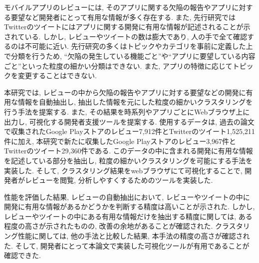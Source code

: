 
モバイルアプリのレビューには, そのアプリに関する欠陥の報告やアプリに対する要望など開発者にとって有用な情報が多く存在する. また, 先行研究ではTwitterのツイートにはアプリに関する開発に有用な情報が記述されることが示されている. しかし, レビューやツイートの数は膨大であり, 人の手で全て確認するのは不可能に近い. 
先行研究の多くはトピックやカテゴリを事前に定義した上で分類を行うため, ``欠陥の発生している機能ごと''や``アプリに要望している内容ごと''といった粒度の細かい分類はできない. また, アプリの特徴に応じてトピックを変更することはできない. 

本研究では, レビューの中から欠陥の報告やアプリに対する要望などの開発に有用な情報を自動抽出し, 抽出した情報を元にした粒度の細かいクラスタリングを行う手法を提案する. また, その結果を時系列やアプリごとにWebブラウザ上に出力し, 可視化する開発者支援ツールを提案する.
使用するデータは, 過去の論文で収集されたGoogle Playストアのレビュー7,912件とTwitterのツイート1,525,211件に加え, 本研究で新たに収集したGoogle Playストアのレビュー3,967件とTwitterのツイート29,360件である. このデータの中に含まれる開発に有用な情報を記述している部分を抽出し, 粒度の細かいクラスタリングを可能にする手法を実装した. 
そして, クラスタリング結果をwebブラウザにて可視化することで, 開発者がレビューを閲覧, 分析しやすくするためのツールを実装した. 

性能を評価した結果, レビューの自動抽出において, レビューやツイートの中に開発に有用な情報があるかどうかを判断する精度は高いことが示された. 
しかし, レビューやツイートの中にある有用な情報だけを抽出する精度に関しては, ある程度の高さが示されたものの, 改善の余地があることが確認された. 
クラスタリング性能に関しては, 他の手法と比較した結果, 本手法の精度の高さが確認された. 
そして, 開発者にとって本論文で実装した可視化ツールが有用であることが確認できた. 
